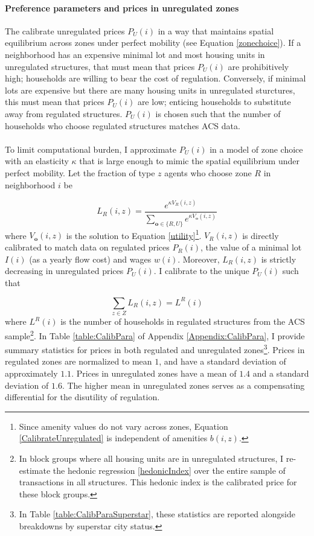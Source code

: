 \documentclass[12pt]{article}
\begin{document}
\paragraph*{Preference parameters and prices in unregulated zones} The calibrate unregulated prices $P_{U}(i)$ in a way that maintains spatial equilibrium across zones under perfect mobility (see Equation \ref{zonechoice}). If a neighborhood has an expensive minimal lot and most housing units in unregulated structures, that must mean that prices $P_{U}(i)$ are prohibitively high; households are willing to bear the cost of regulation. Conversely, if minimal lots are expensive but there are many housing units in unregulated sturctures, this must mean that prices $P_{U}(i)$ are low; enticing households to substitute away from regulated structures. $P_{U}(i)$ is chosen such that the number of households who choose regulated structures matches ACS data. 

\paragraph*{}
To limit computational burden, I approximate $P_{U}(i)$ in a model of zone choice with an elasticity $\kappa$ that is large enough to mimic the spatial equilibrium under perfect mobility. Let the fraction of type $z$ agents who choose zone $R$ in neighborhood $i$ be 

\begin{equation}\label{CalibrateUnregulated}
	L_{R}(i, z) = \frac{e^{\kappa V_{R}(i, z)}}{\sum_{\boldsymbol{o} \in \{R, U\}}e^{\kappa V_{\boldsymbol{o}}(i, z)}}
\end{equation}
where $V_{\boldsymbol{o}}(i, z)$ is the solution to Equation \eqref{utility}\footnote{Since amenity values do not vary across zones, Equation \ref{CalibrateUnregulated} is independent of amenities $b(i, z)$.}. $V_{R}(i, z)$ is directly calibrated to match data on regulated prices $P_{R}(i)$, the value of a minimal lot $I(i)$ (as a yearly flow cost) and wages $w(i)$. Moreover, $L_{R}(i, z)$ is strictly decreasing in unregulated prices $P_{U}(i)$. I calibrate to the unique $P_{U}(i)$ such that 

\begin{equation*}
	\sum_{z \in Z}L_{R}(i, z) = L^{R}(i)
\end{equation*}
where $L^{R}(i)$ is the number of households in regulated structures from the ACS sample\footnote{In block groups where all housing units are in unregulated structures, I re-estimate the hedonic regression \eqref{hedonicIndex} over the entire sample of transactions in all structures. This hedonic index is the calibrated price for these block groups.}. In Table \ref{table:CalibPara} of Appendix \ref{Appendix:CalibPara}, I provide summary statistics for prices in both regulated and unregulated zones\footnote{In Table \ref{table:CalibParaSuperstar}, these statistics are reported alongside breakdowns by superstar city status.}. Prices in regulated zones are normalized to mean $1$, and have a standard deviation of approximately $1.1$. Prices in unregulated zones have a mean of $1.4$ and a standard deviation of $1.6$. The higher mean in unregulated zones serves as a compensating differential for the disutility of regulation. 
  
\end{document}
